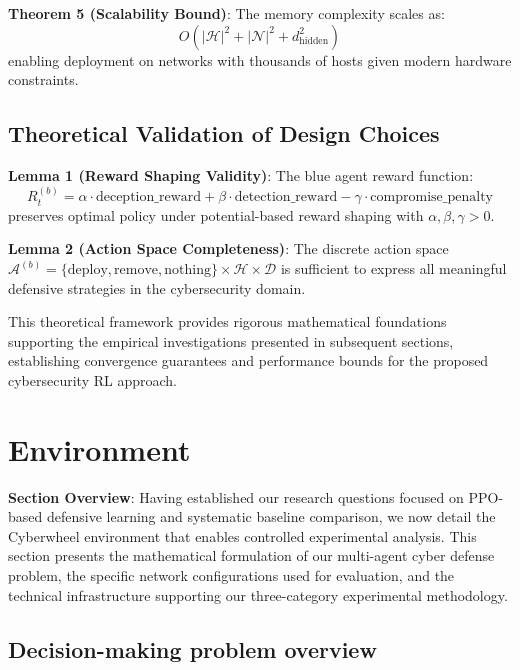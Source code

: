 \documentclass[12pt,oneside]{article}
\begin{document}
\textbf{Theorem 5 (Scalability Bound)}: The memory complexity scales as:
\begin{equation}
O(|\mathcal{H}|^2 + |\mathcal{N}|^2 + d_{\text{hidden}}^2)
\end{equation}
enabling deployment on networks with thousands of hosts given modern hardware constraints.

\subsection{Theoretical Validation of Design Choices}

\textbf{Lemma 1 (Reward Shaping Validity)}: The blue agent reward function:
\begin{equation}
R^{(b)}_t = \alpha \cdot \text{deception\_reward} + \beta \cdot \text{detection\_reward} - \gamma \cdot \text{compromise\_penalty}
\end{equation}
preserves optimal policy under potential-based reward shaping with $\alpha, \beta, \gamma > 0$.

\textbf{Lemma 2 (Action Space Completeness)}: The discrete action space $\mathcal{A}^{(b)} = \{\text{deploy}, \text{remove}, \text{nothing}\} \times \mathcal{H} \times \mathcal{D}$ is sufficient to express all meaningful defensive strategies in the cybersecurity domain.

This theoretical framework provides rigorous mathematical foundations supporting the empirical investigations presented in subsequent sections, establishing convergence guarantees and performance bounds for the proposed cybersecurity RL approach.




\section{Environment}

\textbf{Section Overview}: Having established our research questions focused on PPO-based defensive learning and systematic baseline comparison, we now detail the Cyberwheel environment that enables controlled experimental analysis. This section presents the mathematical formulation of our multi-agent cyber defense problem, the specific network configurations used for evaluation, and the technical infrastructure supporting our three-category experimental methodology.

\subsection{Decision-making problem overview}
\end{document}
